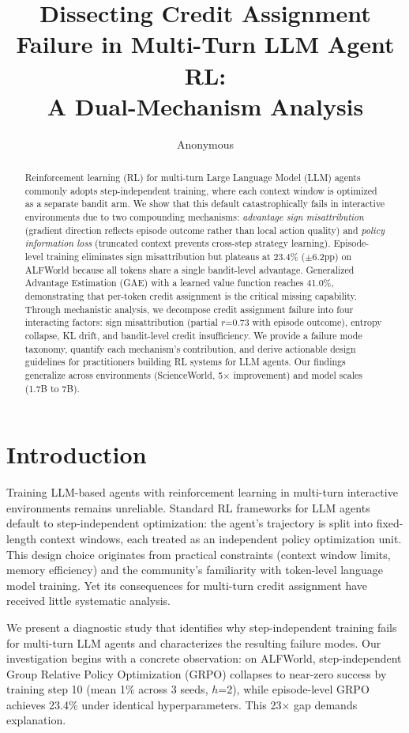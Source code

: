 \documentclass{article}
\title{Dissecting Credit Assignment Failure in Multi-Turn LLM Agent RL:\\A Dual-Mechanism Analysis}
\author{Anonymous}
\date{}
\begin{document}
\maketitle

\begin{abstract}
Reinforcement learning (RL) for multi-turn Large Language Model (LLM) agents commonly adopts step-independent training, where each context window is optimized as a separate bandit arm. We show that this default catastrophically fails in interactive environments due to two compounding mechanisms: \emph{advantage sign misattribution} (gradient direction reflects episode outcome rather than local action quality) and \emph{policy information loss} (truncated context prevents cross-step strategy learning). Episode-level training eliminates sign misattribution but plateaus at 23.4\% ($\pm$6.2pp) on ALFWorld because all tokens share a single bandit-level advantage. Generalized Advantage Estimation (GAE) with a learned value function reaches 41.0\%, demonstrating that per-token credit assignment is the critical missing capability. Through mechanistic analysis, we decompose credit assignment failure into four interacting factors: sign misattribution (partial $r$=0.73 with episode outcome), entropy collapse, KL drift, and bandit-level credit insufficiency. We provide a failure mode taxonomy, quantify each mechanism's contribution, and derive actionable design guidelines for practitioners building RL systems for LLM agents. Our findings generalize across environments (ScienceWorld, 5$\times$ improvement) and model scales (1.7B to 7B).
\end{abstract}

\section{Introduction}

Training LLM-based agents with reinforcement learning in multi-turn interactive environments remains unreliable. Standard RL frameworks for LLM agents default to step-independent optimization: the agent's trajectory is split into fixed-length context windows, each treated as an independent policy optimization unit. This design choice originates from practical constraints (context window limits, memory efficiency) and the community's familiarity with token-level language model training. Yet its consequences for multi-turn credit assignment have received little systematic analysis.

We present a diagnostic study that identifies why step-independent training fails for multi-turn LLM agents and characterizes the resulting failure modes. Our investigation begins with a concrete observation: on ALFWorld, step-independent Group Relative Policy Optimization (GRPO) collapses to near-zero success by training step 10 (mean 1\% across 3 seeds, $h$=2), while episode-level GRPO achieves 23.4\% under identical hyperparameters. This 23$\times$ gap demands explanation.
\end{document}

